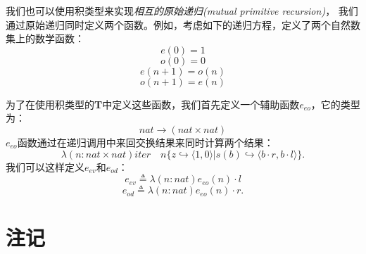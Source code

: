 我们也可以使用积类型来实现\textit{相互的原始递归(mutual primitive recursion)}，
我们通过原始递归同时定义两个函数。例如，考虑如下的递归方程，定义了两个自然数集上的数学函数：
\begin{equation*}
    e(0) = 1
\end{equation*}
\begin{equation*}
    o(0) = 0
\end{equation*}
\begin{equation*}
    e(n+1) = o(n)
\end{equation*}
\begin{equation*}
    o(n+1) = e(n)
\end{equation*}


为了在使用积类型的\textbf{T}中定义这些函数，我们首先定义一个辅助函数$e_{eo}$，它的类型为：
$$nat \rightarrow (nat \times nat)$$
$e_{eo}$函数通过在递归调用中来回交换结果来同时计算两个结果：
$$
\lambda (n:nat\times nat) iter \quad n \{ z \hookrightarrow \langle 1,0 \rangle |
s(b) \hookrightarrow \langle b \cdot r, b \cdot l \rangle \}.
$$
我们可以这样定义$e_{ev}$和$e_{od}$：
\begin{equation*}
    e_{ev} \triangleq \lambda(n:nat)e_{eo}(n) \cdot l
\end{equation*}
\begin{equation*}
    e_{od} \triangleq \lambda(n:nat)e_{eo}(n) \cdot r.
\end{equation*}


\section{注记}


